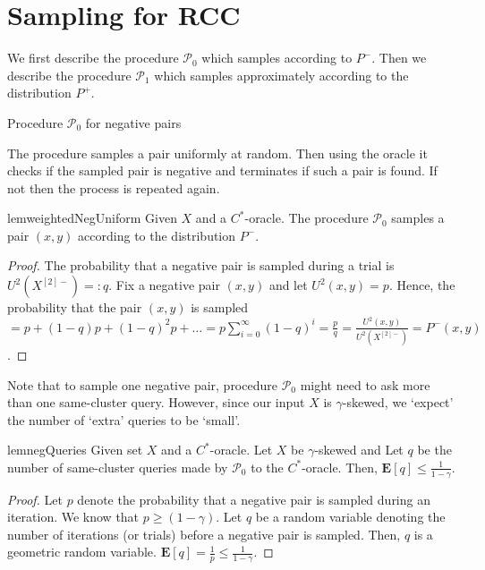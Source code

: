 \documentclass[12pt]{article}
\newcommand{\mb}{\mathbf}
\newcommand{\mc}{\mathcal}
\begin{document}
\section{Sampling for RCC}
\label{section:samplingRCC}
We first describe the procedure $\mc P_0$ which samples according to $P^-$. Then we describe the procedure $\mc P_1$ which samples approximately according to the distribution $P^+$. 

\SetAlgoNoLine
\LinesNumbered
\SetNlSkip{-0.4em}
\begin{algorithm}
\label{alg:weightedNegPairs}
\caption{Procedure $\mc P_0$ for negative pairs}

\Indp{}

\vspace{0.1in} 
\end{algorithm}
The procedure samples a pair uniformly at random. Then using the oracle it checks if the sampled pair is negative and terminates if such a pair is found. If not then the process is repeated again. 

\begin{restatable}{lem}{weightedNegUniform}
\label{lemma:weightedNegUniform}
Given $X$ and a $C^*$-oracle. The procedure $\mc P_0$ samples a pair $(x, y)$ according to the distribution $P^-$.
\end{restatable}
\begin{proof}
The probability that a negative pair is sampled during a trial is $U^2(X^{[2]-}) =: q$. Fix a negative pair $(x, y)$ and let $U^2(x, y) = p$. Hence, the probability that the pair $(x, y)$ is sampled $= p + (1-q)p + (1-q)^2p + \ldots = p\sum_{i=0}^\infty (1-q)^i = \frac{p}{q} = \frac{U^2(x, y)}{U^2(X^{[2]-})} = P^-(x, y)$.
\end{proof}

\noindent Note that to sample one negative pair, procedure $\mc P_0$ might need to ask more than one same-cluster query. However, since our input $X$ is $\gamma$-skewed, we `expect' the number of `extra' queries to be `small'. 

\begin{restatable}{lem}{negQueries}
\label{lemma:negQueries}Given set $X$ and a $C^*$-oracle. Let $X$ be $\gamma$-skewed and Let $q$ be the number of same-cluster queries made by $\mc P_0$ to the $C^*$-oracle. Then, $\mb E[q] \le \frac{1}{1-\gamma}$.
\end{restatable}
\begin{proof}
Let $p$ denote the probability that a negative pair is sampled during an iteration. We know that $p \ge (1 - \gamma)$. Let $q$ be a random variable denoting the number of iterations (or trials) before a negative pair is sampled. Then, $q$ is a geometric random variable. $\mb E[q] = \frac{1}{p} \le \frac{1}{1-\gamma}$.
\end{proof}
\end{document}
